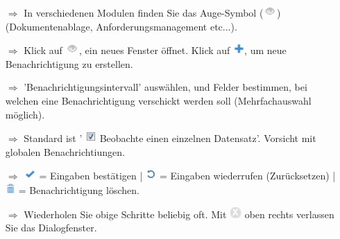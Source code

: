 \documentclass{article}
\begin{document}
\begin{multicols}{2}

\begin{tcolorbox}[colback=blue!5,colframe=blue!40!black,title=Benachrichtigungen einrichten]
\begin{itemize}
  \item[$\Longrightarrow$] In verschiedenen Modulen finden Sie das Auge-Symbol (\includegraphics[height=12pt]{Icons/Auge_g.jpg}) (Dokumentenablage, Anforderungsmanagement etc...).
  \item[$\Longrightarrow$] Klick auf \includegraphics[height=12pt]{Icons/Auge_g.jpg}, ein neues Fenster öffnet. Klick auf \includegraphics[height=12pt]{Icons/Pluszeichen.jpg}, um neue Benachrichtigung zu erstellen.
  \item[$\Longrightarrow$] 'Benachrichtigungsintervall' auswählen, und Felder bestimmen, bei welchen eine Benachrichtigung verschickt werden soll (Mehrfachauswahl möglich).
	\item[$\Longrightarrow$] Standard ist ' \includegraphics[height=12pt]{Icons/checkbox_markiert.jpg} Beobachte einen einzelnen Datensatz'. Vorsicht mit globalen Benachrichtiungen.
  \item[$\Longrightarrow$] \includegraphics[height=12pt]{Icons/Gutzeichen.jpg} = Eingaben bestätigen | \includegraphics[height=12pt]{Icons/Refresh.jpg} = Eingaben wiederrufen (Zurücksetzen) | \includegraphics[height=12pt]{Icons/Muelltonne.jpg} = Benachrichtigung löschen.
  \item[$\Longrightarrow$] Wiederholen Sie obige Schritte beliebig oft. Mit \includegraphics[height=12pt]{Icons/X_Button.jpg} oben rechts verlassen Sie das Dialogfenster.
\end{itemize}
\end{tcolorbox}





\end{multicols}
\end{document}

